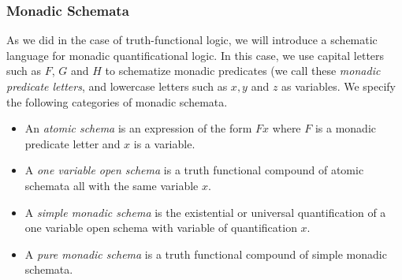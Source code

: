 \subsubsection*{Monadic Schemata}
As we did in the case of truth-functional logic, we will introduce a schematic language for monadic quantificational logic. In this case, we use capital letters such as $F$, $G$ and $H$ to schematize monadic predicates (we call these \emph{monadic predicate letters}, and lowercase letters such as $x, y$ and $z$ as variables. We specify the following categories of monadic schemata.
\begin{itemize}
\item
An \emph{atomic schema} is an expression of the form $Fx$ where $F$ is a monadic predicate letter and $x$ is a variable.
\item 
A \emph{ one variable open schema} is a truth functional compound of atomic schemata all with the same variable $x$.
\item
A \emph{ simple monadic schema} is the existential or universal quantification of
a one variable open schema with variable of quantification $x.$
\item
A \emph{ pure monadic schema} is a truth functional compound of simple monadic
schemata. 
\end{itemize}